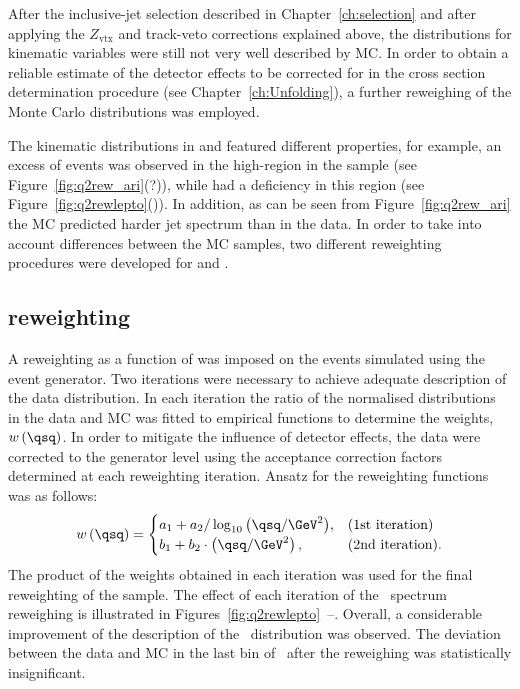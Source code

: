 After the inclusive-jet selection described in Chapter~\ref{ch:selection} and after applying the $Z_\text{vtx}$ and track-veto corrections explained above, the distributions for kinematic variables were still not very well described by MC. In order to obtain a reliable estimate of the detector effects to be corrected for in the cross section determination procedure (see Chapter~\ref{ch:Unfolding}), a further reweighing of the Monte Carlo distributions was employed. 

The kinematic distributions in \lepto and \ariadne featured different properties, for example, an excess of events was observed in the high-\qsq region in the \ariadne sample (see Figure~\ref{fig:q2rew_ari}(?)), while \lepto had a deficiency in this region (see Figure~\ref{fig:q2rewlepto}()). In addition, as can be seen from Figure~\ref{fig:q2rew_ari} the \ariadne MC predicted harder jet spectrum than in the data. In order to take into account differences between the MC samples, two different reweighting procedures were developed for \lepto and \ariadne.

\subsection{\lepto reweighting}
A reweighting as a function of \qsq was imposed on the events simulated using the \lepto event generator. Two iterations were necessary to achieve adequate description of the data distribution. In each iteration the ratio of the normalised \qsq distributions in the data and MC was fitted to empirical functions to determine the weights, $w\left( \qsq\right) $. In order to mitigate the influence of detector effects, the data were corrected to the generator level using the acceptance correction factors determined at each reweighting iteration. Ansatz for the reweighting functions was as follows:
\begin{equation}
w\left( \qsq\right) = 
\begin{cases}
a_1 + a_2 / \log_{10}{\left( \qsq/\GeV^2\right) }, & \text{(1st iteration)} \\
b_1 + b_2 \cdot \left( \qsq/\GeV^2\right) ,            & \text{(2nd iteration)}.
\end{cases}
\end{equation}
The product of the weights obtained in each iteration was used for the final reweighting of the \lepto sample. The effect of each iteration of the \qsq~spectrum reweighing is illustrated in Figures~\ref{fig:q2rewlepto}~--. Overall, a considerable improvement of the description of the \qsq~distribution was observed. The deviation between the data and MC in the last bin of \qsq~after the reweighing was statistically insignificant.

